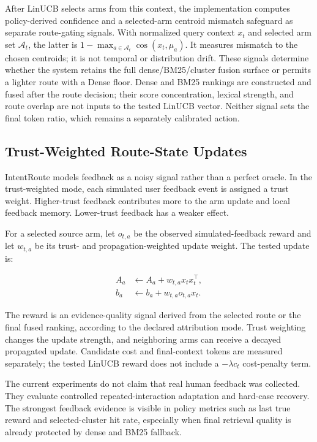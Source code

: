 After LinUCB selects arms from this context, the implementation computes policy-derived confidence and a selected-arm centroid mismatch safeguard as separate route-gating signals. With normalized query context $x_t$ and selected arm set $\mathcal{A}_t$, the latter is $1-\max_{a\in\mathcal{A}_t}\cos(x_t,\mu_a)$. It measures mismatch to the chosen centroids; it is not temporal or distribution drift. These signals determine whether the system retains the full dense/BM25/cluster fusion surface or permits a lighter route with a Dense floor. Dense and BM25 rankings are constructed and fused after the route decision; their score concentration, lexical strength, and route overlap are not inputs to the tested LinUCB vector. Neither signal sets the final token ratio, which remains a separately calibrated action.

\subsection{Trust-Weighted Route-State Updates}
\label{sec:04-method:trust-weighted-route-state-updates}

IntentRoute models feedback as a noisy signal rather than a perfect oracle. In the trust-weighted mode, each simulated user feedback event is assigned a trust weight. Higher-trust feedback contributes more to the arm update and local feedback memory. Lower-trust feedback has a weaker effect.

For a selected source arm, let $o_{t,a}$ be the observed simulated-feedback reward and let $w_{t,a}$ be its trust- and propagation-weighted update weight. The tested update is:

\[
\begin{aligned}
A_a &\leftarrow A_a + w_{t,a} x_t x_t^\top, \\
b_a &\leftarrow b_a + w_{t,a} o_{t,a} x_t.
\end{aligned}
\]

The reward is an evidence-quality signal derived from the selected route or the final fused ranking, according to the declared attribution mode. Trust weighting changes the update strength, and neighboring arms can receive a decayed propagated update. Candidate cost and final-context tokens are measured separately; the tested LinUCB reward does not include a $-\lambda c_t$ cost-penalty term.

The current experiments do not claim that real human feedback was collected. They evaluate controlled repeated-interaction adaptation and hard-case recovery. The strongest feedback evidence is visible in policy metrics such as last true reward and selected-cluster hit rate, especially when final retrieval quality is already protected by dense and BM25 fallback.

